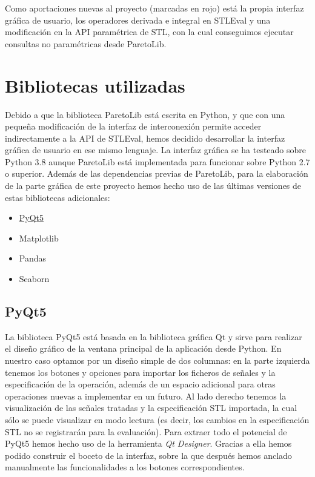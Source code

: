 Como aportaciones nuevas al proyecto (marcadas en rojo) está la propia interfaz gráfica de usuario, los operadores derivada e integral en STLEval y una modificación en la API paramétrica de STL, con la cual conseguimos ejecutar consultas no paramétricas desde ParetoLib.

\section{Bibliotecas utilizadas}

Debido a que la biblioteca ParetoLib está escrita en Python, y que con una pequeña modificación de la interfaz de interconexión permite acceder indirectamente a la API de STLEval, hemos decidido desarrollar la interfaz gráfica de usuario en ese mismo lenguaje. La interfaz gráfica se ha testeado sobre Python 3.8 aunque ParetoLib está implementada para funcionar sobre Python 2.7 o superior. Además de las dependencias previas de ParetoLib, para la elaboración de la parte gráfica de este proyecto hemos hecho uso de las últimas versiones de estas bibliotecas adicionales:
\begin{itemize}
\item \href{https://www.qt.io/qt-for-python}{PyQt5}
\item Matplotlib
\item Pandas
\item Seaborn
\end{itemize}
 
\subsection{PyQt5}
La biblioteca PyQt5 está basada en la biblioteca gráfica Qt y sirve para realizar el diseño gráfico de la ventana principal de la aplicación desde Python. En nuestro caso optamos por un diseño simple de dos columnas: en la parte izquierda tenemos los botones y opciones para importar los ficheros de señales y la especificación de la operación, además de un espacio adicional para otras operaciones nuevas a implementar en un futuro. Al lado derecho tenemos la visualización de las señales tratadas y la especificación STL importada, la cual sólo se puede visualizar en modo lectura (es decir, los cambios en la especificación STL no se registrarán para la evaluación). Para extraer todo el potencial de PyQt5 hemos hecho uso de la herramienta \textit{Qt Designer}. Gracias a ella hemos podido construir el boceto de la interfaz, sobre la que después hemos anclado manualmente las funcionalidades a los botones correspondientes.

